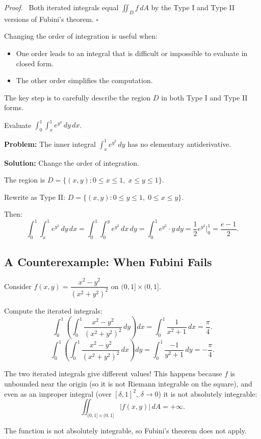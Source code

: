 \documentclass[11pt]{report}
\renewenvironment{proof}[1][Proof]{\par\noindent\textit{#1.}\ }{\hfill$\square$\par\medskip}
\begin{document}
\begin{proof}
Both iterated integrals equal $\iint_D f \, dA$ by the Type I and Type II versions of Fubini's theorem.
\end{proof}

\begin{remark}
Changing the order of integration is useful when:
\begin{itemize}
    \item One order leads to an integral that is difficult or impossible to evaluate in closed form.
    \item The other order simplifies the computation.
\end{itemize}
The key step is to carefully describe the region $D$ in both Type I and Type II forms.
\end{remark}

\begin{example}
Evaluate $\displaystyle \int_0^1 \int_x^1 e^{y^2} \, dy \, dx$.

\textbf{Problem:} The inner integral $\int_x^1 e^{y^2} \, dy$ has no elementary antiderivative.

\textbf{Solution:} Change the order of integration.

The region is $D = \{(x, y) : 0 \leq x \leq 1, \; x \leq y \leq 1\}$.

Rewrite as Type II: $D = \{(x, y) : 0 \leq y \leq 1, \; 0 \leq x \leq y\}$.

Then:
\[
\int_0^1 \int_x^1 e^{y^2} \, dy \, dx = \int_0^1 \int_0^y e^{y^2} \, dx \, dy = \int_0^1 e^{y^2} \cdot y \, dy = \frac{1}{2} e^{y^2} \Big|_0^1 = \frac{e - 1}{2}.
\]
\end{example}

\subsection*{A Counterexample: When Fubini Fails}

\begin{example}
Consider $f(x, y) = \dfrac{x^2 - y^2}{(x^2 + y^2)^2}$ on $(0, 1] \times (0, 1]$.

Compute the iterated integrals:
\[
\int_0^1 \left( \int_0^1 \frac{x^2 - y^2}{(x^2 + y^2)^2} \, dy \right) dx = \int_0^1 \frac{1}{x^2 + 1} \, dx = \frac{\pi}{4}.
\]
\[
\int_0^1 \left( \int_0^1 \frac{x^2 - y^2}{(x^2 + y^2)^2} \, dx \right) dy = \int_0^1 \frac{-1}{y^2 + 1} \, dy = -\frac{\pi}{4}.
\]

The two iterated integrals give different values! This happens because $f$ is unbounded near the origin (so it is not Riemann integrable on the square), and even as an improper integral (over $[\delta, 1]^2$, $\delta \to 0$) it is not absolutely integrable:
\[
\iint_{(0,1] \times (0,1]} |f(x, y)| \, dA = +\infty.
\]

The function is not absolutely integrable, so Fubini's theorem does not apply.
\end{example}
\end{document}
